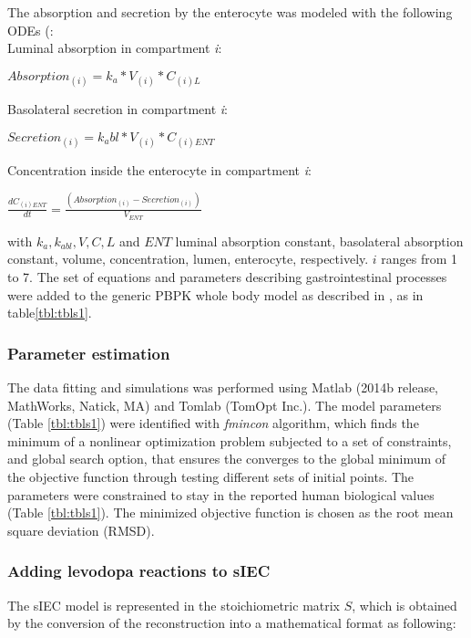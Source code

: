 The absorption and secretion by the enterocyte was modeled with the following ODEs (\cite{agoram2001predicting}:\\
Luminal absorption in compartment \textit{i}: \\
\begin{center}
$Absorption_{(i)}=k_a*V_(i)*C_{(i)L}$\\
\end{center}
Basolateral secretion in compartment \textit{i}:\\
\begin{center}
$Secretion_{(i)}=k_abl*V_(i)*C_{(i)ENT}$ \\
\end{center}
Concentration inside the enterocyte in compartment \textit{i}:\\
\begin{center}
$\frac{dC_{(i)ENT}}{dt}=\frac{(Absorption_{(i)}-Secretion_{(i)})}{V_{ENT}}$\\
\end{center}
with $k_a,k_{abl},V,C,L$ and $ENT$ luminal absorption constant, basolateral absorption constant, volume, concentration, lumen, enterocyte, respectively. $i$ ranges from 1 to 7.
The set of equations and parameters describing gastrointestinal processes were added to the generic PBPK whole body model as described in \cite{peters2008evaluation},  as in table\ref{tbl:tbls1}.

\subsubsection{Parameter estimation} \label{levo:sp2}
The data fitting and simulations was performed using Matlab (2014b release, MathWorks, Natick, MA) and Tomlab (TomOpt Inc.). The model parameters (Table \ref{tbl:tbls1}) were identified with \textit{fmincon} algorithm, which finds the minimum of a nonlinear optimization problem subjected to a set of constraints,  and global search option, that ensures the converges to the global minimum of the objective function through testing different sets of initial points. The parameters were constrained to stay in the reported human biological values (Table \ref{tbl:tbls1}). The minimized objective function is chosen as the root mean square deviation (RMSD).

\subsubsection{Adding levodopa reactions to sIEC} \label{levo:sp3}
The sIEC model is represented in the stoichiometric matrix $S$, which is obtained by the conversion of the reconstruction into a mathematical format as following:

